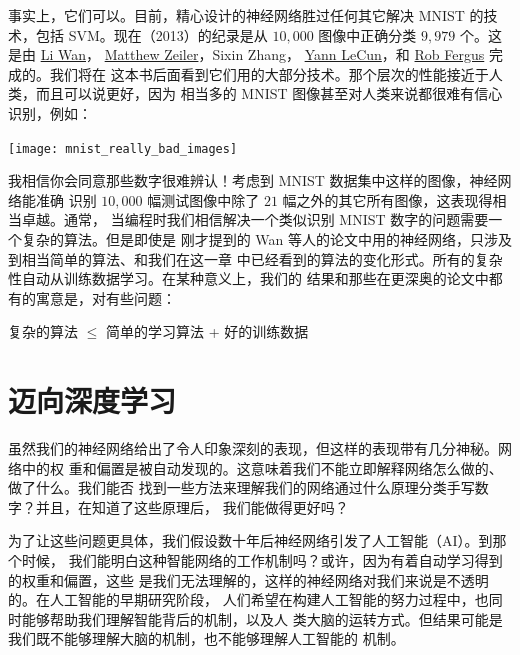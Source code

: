 事实上，它们可以。目前，精心设计的神经网络胜过任何其它解决 MNIST 的技术，包括
SVM。现在（2013）的纪录是从 $10,000$ 图像中正确分类 $9,979$ 个。这是由
\href{http://www.cs.nyu.edu/~wanli/}{Li Wan}，
\href{http://www.matthewzeiler.com/}{Matthew Zeiler}，Sixin Zhang，
\href{http://yann.lecun.com/}{Yann LeCun}，和
\href{http://cs.nyu.edu/~fergus/pmwiki/pmwiki.php}{Rob Fergus} 完成的。我们将在
这本书后面看到它们用的大部分技术。那个层次的性能接近于人类，而且可以说更好，因为
相当多的 MNIST 图像甚至对人类来说都很难有信心识别，例如：
\begin{center}
  \texttt{[image: mnist\_really\_bad\_images]}
\end{center}

我相信你会同意那些数字很难辨认！考虑到 MNIST 数据集中这样的图像，神经网络能准确
识别 $10,000$ 幅测试图像中除了 $21$ 幅之外的其它所有图像，这表现得相当卓越。通常，
当编程时我们相信解决一个类似识别 MNIST 数字的问题需要一个复杂的算法。但是即使是
刚才提到的 Wan 等人的论文中用的神经网络，只涉及到相当简单的算法、和我们在这一章
中已经看到的算法的变化形式。所有的复杂性自动从训练数据学习。在某种意义上，我们的
结果和那些在更深奥的论文中都有的寓意是，对有些问题：

\begin{center}
  复杂的算法 $\leq$ 简单的学习算法 + 好的训练数据
\end{center}

\section{迈向深度学习}
\label{sec:toward_deep_learning}

虽然我们的神经网络给出了令人印象深刻的表现，但这样的表现带有几分神秘。网络中的权
重和偏置是被自动发现的。这意味着我们不能立即解释网络怎么做的、做了什么。我们能否
找到一些方法来理解我们的网络通过什么原理分类手写数字？并且，在知道了这些原理后，
我们能做得更好吗？

为了让这些问题更具体，我们假设数十年后神经网络引发了人工智能（AI）。到那个时候，
我们能明白这种智能网络的工作机制吗？或许，因为有着自动学习得到的权重和偏置，这些
是我们无法理解的，这样的神经网络对我们来说是不透明的。在人工智能的早期研究阶段，
人们希望在构建人工智能的努力过程中，也同时能够帮助我们理解智能背后的机制，以及人
类大脑的运转方式。但结果可能是我们既不能够理解大脑的机制，也不能够理解人工智能的
机制。

